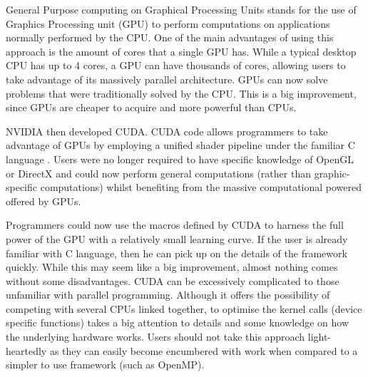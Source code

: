 \documentclass[12pt, openany]{book}
\begin{document}
General Purpose computing on Graphical Processing Units stands for the use of Graphics Processing unit (GPU) to perform computations on applications normally performed by the CPU. One of the main advantages of using this approach is the amount of cores that a single GPU has. While a typical desktop CPU has up to 4 cores, a GPU can have thousands of cores, allowing users to take advantage of its massively parallel architecture. GPUs can now solve problems that were traditionally solved by the CPU. This is a big improvement, since GPUs are cheaper to acquire and more powerful than CPUs.\par
	NVIDIA then developed CUDA. CUDA code allows programmers to take advantage of GPUs by employing a unified shader pipeline under the familiar C language \cite{cuda_by_example}. Users were no longer required to have specific knowledge of OpenGL or DirectX and could now perform general computations (rather than graphic-specific computations) whilst benefiting from the massive computational powered offered by GPUs. 
	\par Programmers could now use the macros defined by CUDA to harness the full power of the GPU with a relatively small learning curve. If the user is already familiar with C language, then he can pick up on the details of the framework quickly. While this may seem like a big improvement, almost nothing comes without some disadvantages. CUDA can be excessively complicated to those unfamiliar with parallel programming. Although it offers the possibility of competing with several CPUs linked together, to optimise the kernel calls (device specific functions) takes a big attention to details and some knowledge on how the underlying hardware works. Users should not take this approach light-heartedly as they can easily become encumbered with work when compared to a simpler to use framework (such as OpenMP).  
\end{document}
